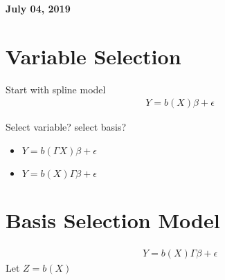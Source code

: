 \documentclass[11pt]{article}
\begin{document}
%

\newcommand{\Ito}{$It\hat{o}$'$s~Lemma$}

\newcommand\ind{\stackrel{\rm ind}{\sim}}
\newcommand\iid{\stackrel{\rm iid}{\sim}}
\renewcommand\c{\mathbf{c}}
\newcommand\y{\mathbf{y}}
\newcommand\z{\mathbf{z}}
\renewcommand\P{\mathbf{P}}
\newcommand\W{\mathbf{W}}
\newcommand\X{\mathbf{X}}
\newcommand\Y{\mathbf{Y}}
\newcommand\Z{\mathbf{Z}}
\newcommand\J{{\cal J}}
\newcommand\B{{\cal B}}
\newcommand\K{{\cal K}}
\newcommand\N{{\rm N}}
\newcommand\bs{\boldsymbol}
\newcommand\bth{\bs\theta}
\newcommand\bbe{\bs\beta}
\renewcommand\*{^\star}

\def\spacingset#1{\renewcommand{\baselinestretch}%
{#1}\small\normalsize} \spacingset{1}



  \bigskip
  \bigskip
  \bigskip
  \begin{center}
    {\LARGE\bf July 04, 2019 }
  \end{center}
  \medskip



\spacingset{1.45}






\section{Variable Selection}
Start with spline model
\begin{align*}
Y = b(X)\beta + \epsilon
\end{align*}

Select variable? select basis?
\begin{itemize}
	\item $Y = b(\Gamma X)\beta + \epsilon$
	\item $Y = b( X)\Gamma\beta + \epsilon$
\end{itemize}

\section{Basis Selection Model}
\begin{align*}
Y = b( X)\Gamma\beta + \epsilon
\end{align*}
Let $Z = b(X)$
\end{document}
